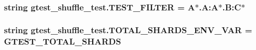\subsubsection[{T\+E\+S\+T\+\_\+\+F\+I\+L\+T\+E\+R}]{\setlength{\rightskip}{0pt plus 5cm}string gtest\+\_\+shuffle\+\_\+test.\+T\+E\+S\+T\+\_\+\+F\+I\+L\+T\+E\+R = \textquotesingle{}A$\ast$.A\+:\+A$\ast$.B\+:\+C$\ast$\textquotesingle{}}\label{namespacegtest__shuffle__test_ac2a2a6c7c009be4f94bc9c8bc0c51bb5}
\hypertarget{namespacegtest__shuffle__test_a29088c2bb51a4550fa2a668d972f973a}{}
\subsubsection[{T\+O\+T\+A\+L\+\_\+\+S\+H\+A\+R\+D\+S\+\_\+\+E\+N\+V\+\_\+\+V\+A\+R}]{\setlength{\rightskip}{0pt plus 5cm}string gtest\+\_\+shuffle\+\_\+test.\+T\+O\+T\+A\+L\+\_\+\+S\+H\+A\+R\+D\+S\+\_\+\+E\+N\+V\+\_\+\+V\+A\+R = \textquotesingle{}G\+T\+E\+S\+T\+\_\+\+T\+O\+T\+A\+L\+\_\+\+S\+H\+A\+R\+D\+S\textquotesingle{}}\label{namespacegtest__shuffle__test_a29088c2bb51a4550fa2a668d972f973a}
